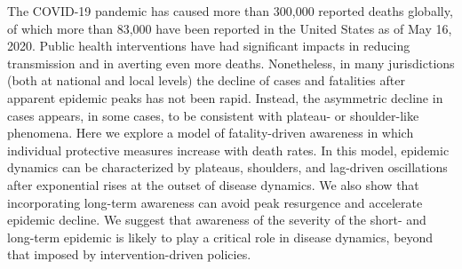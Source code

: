The COVID-19 pandemic has caused more than 300,000 reported deaths
globally, of which more than 83,000 have been reported
in the United States as of May 16, 2020. Public health interventions
have had significant impacts in reducing transmission and in
averting even more deaths. Nonetheless, in many jurisdictions
(both at national and local levels) the decline of cases and fatalities
after apparent epidemic peaks has not been rapid.  Instead, the asymmetric
decline in cases appears, in some cases, to be consistent
with plateau- or shoulder-like phenomena.  
Here we explore a model of fatality-driven
awareness in which individual protective measures increase
with death rates.  In this model, epidemic dynamics
can be characterized by plateaus, shoulders,
and lag-driven oscillations after exponential rises
at the outset of disease dynamics. We also show that
incorporating long-term awareness can avoid peak resurgence and accelerate
epidemic decline.  We suggest that awareness of the severity of the short- and long-term epidemic is likely to play a critical
role in disease dynamics, beyond that imposed by intervention-driven policies.
